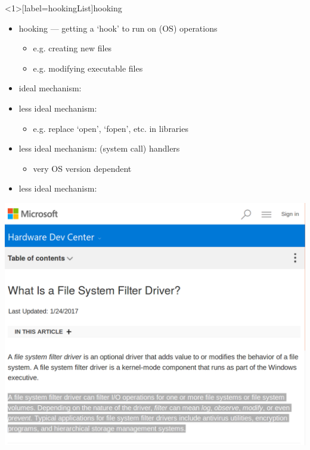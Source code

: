 \begin{frame}<1>[label=hookingList]{hooking}
    \begin{itemize}
    \item hooking --- getting a `hook' to run on (OS) operations
        \begin{itemize}
        \item e.g. creating new files
        \item e.g. modifying executable files
        \end{itemize}
    \item ideal mechanism: 
    \item less ideal mechanism: 
        \begin{itemize}
        \item e.g. replace `open', `fopen', etc. in libraries
        \end{itemize}
    \item less ideal mechanism:  (system call) handlers
        \begin{itemize}
        \item very OS version dependent
        \end{itemize} 
    \item less ideal mechanism: 
    \end{itemize}
\end{frame}


\begin{frame}
\includegraphics[height=0.9\textheight]{../antianti/filter-driver}
\end{frame}

